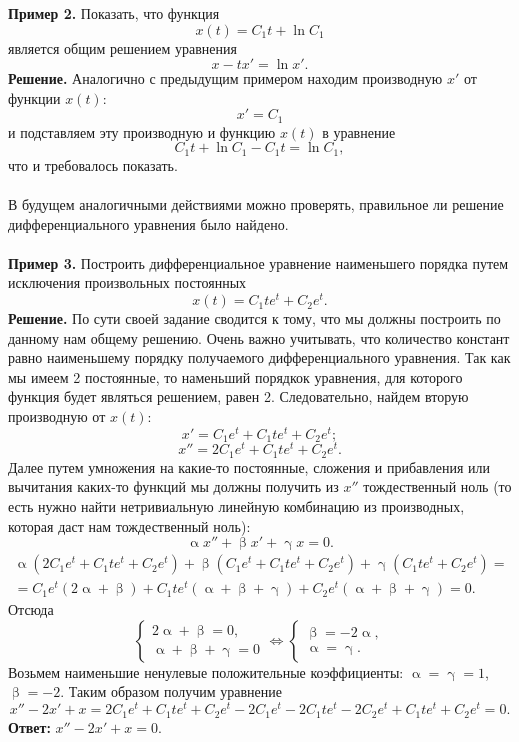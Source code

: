 \documentclass[a4paper, 12pt]{article}
\renewcommand{\alpha}{\upalpha}
\renewcommand{\beta}{\upbeta}
\renewcommand{\gamma}{\upgamma}
\begin{document}
	 \textbf{Пример 2.} Показать, что функция $$x(t) = C_1t + \ln C_1$$ является общим решением уравнения $$x - tx' = \ln x'.$$
	 \textbf{Решение.} Аналогично с предыдущим примером находим производную $x'$ от функции $x(t)$:
	 $$x' = C_1$$
	и подставляем эту производную и функцию $x(t)$ в уравнение $$C_1t + \ln C_1 - C_1t = \ln C_1,$$ что и требовалось показать.\\\\
	В будущем аналогичными действиями можно проверять, правильное ли решение дифференциального уравнения было найдено.\\\\
	\textbf{Пример 3.} Построить дифференциальное уравнение наименьшего порядка путем исключения произвольных постоянных $$x(t) = C_1te^t + C_2e^t.$$
	\textbf{Решение.} По сути своей задание сводится к тому, что мы должны построить по данному нам общему решению. Очень важно учитывать, что количество констант равно наименьшему порядку получаемого дифференциального уравнения. Так как мы имеем 2 постоянные, то наменьший порядкок уравнения, для которого функция будет являться решением, равен 2. Следовательно, найдем вторую производную от $x(t)$:
	$$x' = C_1e^t + C_1te^t + C_2e^t;$$
	$$x'' = 2C_1e^t + C_1te^t + C_2e^t.$$
	Далее путем умножения на какие-то постоянные, сложения и прибавления или вычитания каких-то функций мы должны получить из $x''$ тождественный ноль (то есть нужно найти нетривиальную линейную комбинацию из производных, которая даст нам тождественный ноль):
	$$\alpha x'' + \beta x' + \gamma x = 0.$$
	\begin{multline*}
		\alpha (2C_1e^t + C_1te^t + C_2e^t) + \beta (C_1e^t + C_1te^t + C_2e^t) + \gamma (C_1te^t + C_2e^t) = \\=
		C_1e^t(2\alpha + \beta) + C_1te^t(\alpha + \beta + \gamma) + C_2e^t(\alpha + \beta + \gamma) = 0.
	\end{multline*}
	Отсюда
	$$\begin{cases}
		2\alpha + \beta = 0,\\
		\alpha + \beta + \gamma = 0
	\end{cases} \Longleftrightarrow \begin{cases}
		\beta = -2\alpha,\\
	\alpha = \gamma.
\end{cases}$$
Возьмем наименьшие ненулевые положительные коэффициенты: $\alpha = \gamma = 1$, $\beta = -2$. Таким образом получим уравнение $$x'' - 2x' + x  = 2C_1e^t + C_1te^t + C_2e^t -2 C_1e^t -2C_1te^t -2C_2e^t + C_1te^t + C_2e^t = 0.$$
	\textbf{Ответ:} $x'' - 2x' + x = 0$.
\end{document}
